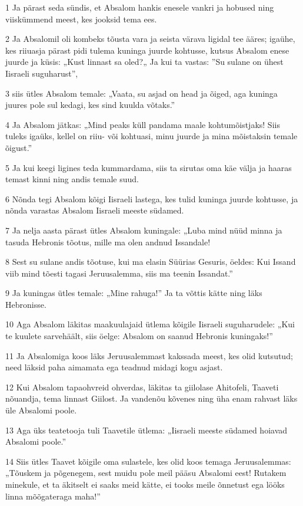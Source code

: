 \par 1 Ja pärast seda sündis, et Absalom hankis enesele vankri ja hobused ning viiskümmend meest, kes jooksid tema ees.
\par 2 Ja Absalomil oli kombeks tõusta vara ja seista värava ligidal tee ääres; igaühe, kes riiuasja pärast pidi tulema kuninga juurde kohtusse, kutsus Absalom enese juurde ja küsis: „Kust linnast sa oled?„ Ja kui ta vastas: ”Su sulane on ühest Iisraeli suguharust”,
\par 3 siis ütles Absalom temale: „Vaata, su asjad on head ja õiged, aga kuninga juures pole sul kedagi, kes sind kuulda võtaks.”
\par 4 Ja Absalom jätkas: „Mind peaks küll pandama maale kohtumõistjaks! Siis tuleks igaüks, kellel on riiu- või kohtuasi, minu juurde ja mina mõistaksin temale õigust.”
\par 5 Ja kui keegi ligines teda kummardama, siis ta sirutas oma käe välja ja haaras temast kinni ning andis temale suud.
\par 6 Nõnda tegi Absalom kõigi Iisraeli lastega, kes tulid kuninga juurde kohtusse, ja nõnda varastas Absalom Iisraeli meeste südamed.
\par 7 Ja nelja aasta pärast ütles Absalom kuningale: „Luba mind nüüd minna ja tasuda Hebronis tõotus, mille ma olen andnud Issandale!
\par 8 Sest su sulane andis tõotuse, kui ma elasin Süürias Gesuris, öeldes: Kui Issand viib mind tõesti tagasi Jeruusalemma, siis ma teenin Issandat.”
\par 9 Ja kuningas ütles temale: „Mine rahuga!” Ja ta võttis kätte ning läks Hebronisse.
\par 10 Aga Absalom läkitas maakuulajaid ütlema kõigile Iisraeli suguharudele: „Kui te kuulete sarvehäält, siis öelge: Absalom on saanud Hebronis kuningaks!”
\par 11 Ja Absalomiga koos läks Jeruusalemmast kakssada meest, kes olid kutsutud; need läksid paha aimamata ega teadnud midagi kogu asjast.
\par 12 Kui Absalom tapaohvreid ohverdas, läkitas ta giilolase Ahitofeli, Taaveti nõuandja, tema linnast Giilost. Ja vandenõu kõvenes ning üha enam rahvast läks üle Absalomi poole.
\par 13 Aga üks teatetooja tuli Taavetile ütlema: „Iisraeli meeste südamed hoiavad Absalomi poole.”
\par 14 Siis ütles Taavet kõigile oma sulastele, kes olid koos temaga Jeruusalemmas: „Tõuskem ja põgenegem, sest muidu pole meil pääsu Absalomi eest! Rutakem minekule, et ta äkitselt ei saaks meid kätte, ei tooks meile õnnetust ega lööks linna mõõgateraga maha!”
